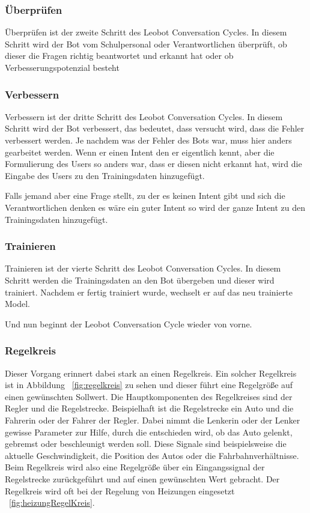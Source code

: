 \subsubsection{Überprüfen}

Überprüfen ist der zweite Schritt des Leobot Conversation Cycles.
In diesem Schritt wird der Bot vom Schulpersonal oder Verantwortlichen überprüft, ob dieser die Fragen richtig beantwortet und erkannt hat oder ob Verbesserungspotenzial besteht

\subsubsection{Verbessern}
Verbessern ist der dritte Schritt des Leobot Conversation Cycles.
In diesem Schritt wird der Bot verbessert, das bedeutet, dass versucht wird, dass die Fehler verbessert werden.
Je nachdem was der Fehler des Bots war, muss hier anders gearbeitet werden.
Wenn er einen Intent den er eigentlich kennt, aber die Formulierung des Users so anders war, dass er diesen nicht erkannt hat, wird die Eingabe des Users zu den Trainingsdaten hinzugefügt.

Falls jemand aber eine Frage stellt, zu der es keinen Intent gibt und sich die Verantwortlichen denken es wäre ein guter Intent so wird der ganze Intent zu den Trainingsdaten hinzugefügt.

\subsubsection{Trainieren}
Trainieren ist der vierte Schritt des Leobot Conversation Cycles.
In diesem Schritt werden die Trainingsdaten an den Bot übergeben und dieser wird trainiert.
Nachdem er fertig trainiert wurde, wechselt er auf das neu trainierte Model.

Und nun beginnt der Leobot Conversation Cycle wieder von vorne.

\subsubsection{Regelkreis}

Dieser Vorgang erinnert dabei stark an einen Regelkreis.
Ein solcher Regelkreis ist in Abbildung ~\ref{fig:regelkreis} zu sehen und dieser führt eine Regelgröße auf einen gewünschten Sollwert.
Die Hauptkomponenten des Regelkreises sind der Regler und die Regelstrecke.
Beispielhaft ist die Regelstrecke ein Auto und die Fahrerin oder der Fahrer der Regler.
Dabei nimmt die Lenkerin oder der Lenker gewisse Parameter zur Hilfe, durch die entschieden wird, ob das Auto gelenkt, gebremst oder beschleunigt werden soll.
Diese Signale sind beispielsweise die aktuelle Geschwindigkeit, die Position des Autos oder die Fahrbahnverhältnisse.
Beim Regelkreis wird also eine Regelgröße über ein Eingangssignal der Regelstrecke zurückgeführt und auf einen gewünschten Wert gebracht.
Der Regelkreis wird oft bei der Regelung von Heizungen eingesetzt ~\ref{fig:heizungRegelKreis}.\cite{regelkreis, regelkreisBeispiel}

